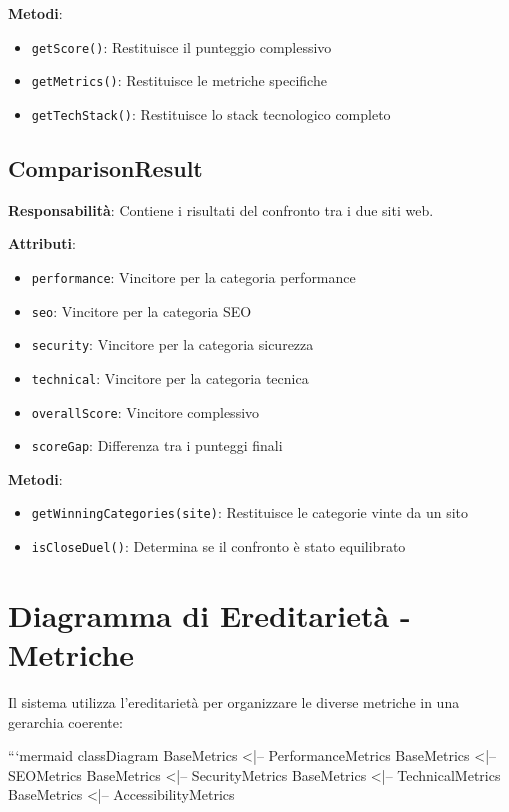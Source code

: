 {{{{{{{\textbf{Metodi}:
\begin{itemize}
    \item \texttt{getScore()}: Restituisce il punteggio complessivo
    \item \texttt{getMetrics()}: Restituisce le metriche specifiche
    \item \texttt{getTechStack()}: Restituisce lo stack tecnologico completo
\end{itemize}

\subsection{ComparisonResult}
\textbf{Responsabilità}: Contiene i risultati del confronto tra i due siti web.

\textbf{Attributi}:
\begin{itemize}
    \item \texttt{performance}: Vincitore per la categoria performance
    \item \texttt{seo}: Vincitore per la categoria SEO
    \item \texttt{security}: Vincitore per la categoria sicurezza
    \item \texttt{technical}: Vincitore per la categoria tecnica
    \item \texttt{overallScore}: Vincitore complessivo
    \item \texttt{scoreGap}: Differenza tra i punteggi finali
\end{itemize}

\textbf{Metodi}:
\begin{itemize}
    \item \texttt{getWinningCategories(site)}: Restituisce le categorie vinte da un sito
    \item \texttt{isCloseDuel()}: Determina se il confronto è stato equilibrato
\end{itemize}

\section{Diagramma di Ereditarietà - Metriche}
Il sistema utilizza l'ereditarietà per organizzare le diverse metriche in una gerarchia coerente:

```mermaid
classDiagram
    BaseMetrics <|-- PerformanceMetrics
    BaseMetrics <|-- SEOMetrics
    BaseMetrics <|-- SecurityMetrics
    BaseMetrics <|-- TechnicalMetrics
    BaseMetrics <|-- AccessibilityMetrics
    
}}}}}}}
